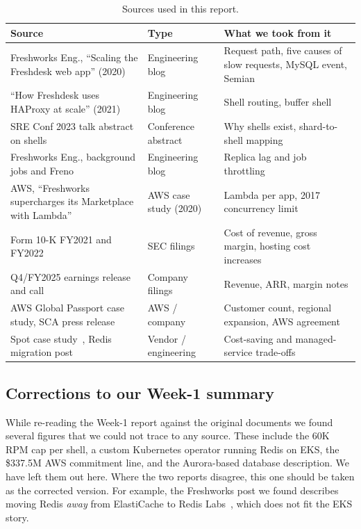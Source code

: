 \documentclass[10pt,a4paper]{article}
\begin{document}
\begin{table}[ht]
\centering\small
\caption{Sources used in this report.}\label{tab:sources}
\begin{tabularx}{\textwidth}{@{}>{\raggedright\arraybackslash}p{} >{\raggedright\arraybackslash}p{} Y@{}}
\toprule
Source & Type & What we took from it \\
\midrule
Freshworks Eng., ``Scaling the Freshdesk web app'' (2020)~\cite{kumar2020} & Engineering blog & Request path, five causes of slow requests, MySQL event, Semian \\
``How Freshdesk uses HAProxy at scale'' (2021)~\cite{mallapu2021} & Engineering blog & Shell routing, buffer shell \\
SRE Conf 2023 talk abstract on shells~\cite{srinivasan2023} & Conference abstract & Why shells exist, shard-to-shell mapping \\
Freshworks Eng., background jobs and Freno~\cite{bgjobs} & Engineering blog & Replica lag and job throttling \\
AWS, ``Freshworks supercharges its Marketplace with Lambda''~\cite{awslambda} & AWS case study (2020) & Lambda per app, 2017 concurrency limit \\
Form 10-K FY2021 and FY2022~\cite{tenk21,tenk22} & SEC filings & Cost of revenue, gross margin, hosting cost increases \\
Q4/FY2025 earnings release and call~\cite{er25,call25} & Company filings & Revenue, ARR, margin notes \\
AWS Global Passport case study, SCA press release~\cite{gp,sca} & AWS / company & Customer count, regional expansion, AWS agreement \\
Spot case study~\cite{spot}, Redis migration post~\cite{redis19} & Vendor / engineering & Cost-saving and managed-service trade-offs \\
\bottomrule
\end{tabularx}
\end{table}

\subsection{Corrections to our Week-1 summary}

While re-reading the Week-1 report against the original documents we found several figures that we could not trace to any source. These include the 60K RPM cap per shell, a custom Kubernetes operator running Redis on EKS, the \$337.5M AWS commitment line, and the Aurora-based database description. We have left them out here. Where the two reports disagree, this one should be taken as the corrected version. For example, the Freshworks post we found describes moving Redis \emph{away} from ElastiCache to Redis Labs~\cite{redis19}, which does not fit the EKS story.
\end{document}
